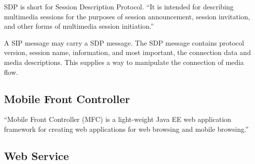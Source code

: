 SDP is short for Session Description Protocol. ``It is intended for describing multimedia sessions for the purposes of session announcement, session invitation, and other forms of multimedia session initiation.''\cite{RFC4566}

A SIP message may carry a SDP message. The SDP message contains protocol version, session name, information, and most important, the connection data and media descriptions. This supplies a way to manipulate the connection of media flow. 

\subsection{Mobile Front Controller}
\label{sec:Solution:InovlvedTechnology:MobileFrontController}

``Mobile Front Controller (MFC) is a light-weight Java EE web application framework for creating web applications for web browsing and mobile browsing.'' \cite{MobileFrontController}



\subsection{Web Service}
\label{sec:Solution:InovlvedTechnology:WebService}











